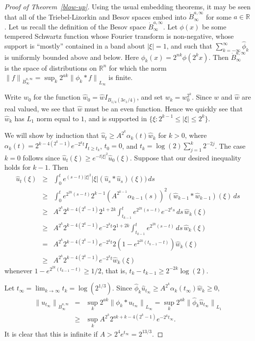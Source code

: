 \documentclass[12pt]{amsart}
\newcommand{\R}{{\mathbb R}}
\newcommand{\modo}[1]{{\left|#1\right|}}
\newcommand{\snormo}[1]{{\mathopen\|#1\mathclose\|}}
\begin{document}
\begin{proof}[Proof of Theorem~\ref{blow-up}]
Using the usual embedding theorems, it may be seen that all of the
Triebel-Lizorkin and Besov spaces
embed into $\dot B_\infty^{a,\infty}$ for some $a \in \R$.
Let us recall the definition of the Besov space $\dot B_\infty^{a,\infty}$.
Let $\phi(x)$ be some 
tempered Schwartz function
whose Fourier transform is non-negative, 
whose support is ``mostly'' contained
in a band about $\modo\xi=1$, and such that
$\sum_{k=-\infty}^\infty \hat \phi_k$ is uniformly bounded above and below.
Here $\phi_k(x) = 2^{nk} \phi(2^k x)$.
Then $\dot B_\infty^{a,\infty}$ is the space of 
distributions on $\R^n$ for
which the norm
$
\snormo f_{\dot B_\infty^{a,\infty}} 
= \sup_k 2^{a k} \snormo{\phi_k* f}_{L_\infty} 
$
is finite.

Write $w_0$ for the function
$
\hat w_0 = \hat w I_{B_{1/4}(3e_1/4)} 
$,
and set $w_k = w_0^{2^k}$.  Since $w$ and $\hat w$ are real valued,
we see that $\hat w$ must be an even function.
Hence we quickly see that
$\hat w_k$ has $L_1$ norm equal to $1$, and is supported in 
$\{\xi:2^{k-1} \le \modo\xi \le 2^k\}$.

We will show by induction
that
$
\hat u_t \ge A^{2^k} \alpha_k(t) \hat w_k 
$
for $k>0$,
where $\alpha_k(t) = 2^{k-4(2^k-1)} e^{-2^k t} I_{t \ge t_k}$,
$t_0=0$, and $t_k = \log(2) \sum_{j=1}^k 2^{-2j}$.
The case $k=0$ follows since
$\hat u_t(\xi) \ge e^{-t \modo{\xi}^2} \hat u_0(\xi)$.
Suppose that our desired inequality holds for $k-1$.  Then
\begin{eqnarray*}
\hat u_t(\xi)
&\ge&
\int_0^t e^{(s-t)\modo{\xi}^2} \modo{\xi} (\hat u_s*\hat u_s)(\xi)) \, ds\\
&\ge&
\int_0^t e^{2^{2k}(s-t)} 2^{k-1} (A^{2^{k-1}} \alpha_{k-1}(s))^2
(\hat w_{k-1}*\hat w_{k-1})(\xi) \, ds\\
&\ge&
A^{2^k} 2^{k-4(2^k-1)} 2^{1+2k}
\int_{t_{k-1}}^t e^{2^{2k}(s-t)} e^{-2^k s} \, ds \, 
\hat w_k(\xi) \\
&\ge&
A^{2^k} 2^{k-4(2^k-1)} e^{-2^k t} 2^{1+2k} 
\int_{t_{k-1}}^t e^{2^{2k}(s-t)} \, ds \, \hat w_k(\xi)\\
&=&
A^{2^k} 2^{k-4(2^k-1)} e^{-2^k t}
2(1-e^{2^{2k}(t_{k-1}-t)}) \hat w_k(\xi)\\
&\ge&
A^{2^k} 2^{k-4(2^k-1)} e^{-2^k t} \hat w_k(\xi)
\end{eqnarray*}
whenever $1-e^{2^{2k}(t_{k-1}-t)} \ge 1/2$, that is, $t_k-t_{k-1} \ge 
2^{-2k} \log(2)$.

Let $t_\infty = \lim_{k\to\infty} t_k
= \log(2^{1/3})$.
Since 
$\hat \phi_k \hat u_{t_\infty} \ge A^{2^k} \alpha_k(t_\infty) \hat w_k \ge 0$,
\begin{eqnarray*}
\snormo{u_{t_\infty}}_{\dot B_{\infty}^{a,\infty}} 
&=& 
\sup_k 2^{ak} \snormo{\phi_k*u_{t_\infty}}_{L_\infty}
=
\sup_k 2^{ak} \snormo{\hat \phi_k \hat u_{t_\infty}}_{L_1} 
\\
&\ge&
\sup_k 
A^{2^k} 2^{ak+k-4(2^k-1)} e^{-2^k t_\infty} .
\end{eqnarray*}
It is clear that this is infinite if $A>2^4 e^{t_\infty} = 2^{13/3}$.
\end{proof}
\end{document}
